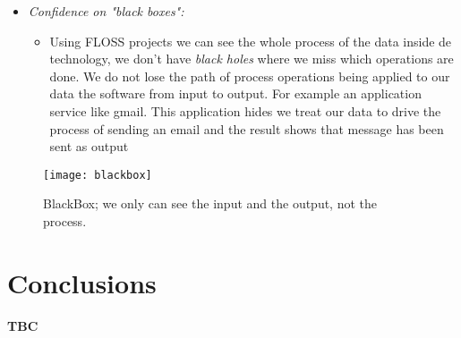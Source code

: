 \begin{itemize}
    \item \emph{Confidence on "black boxes":}
    \begin{itemize}
        \item Using FLOSS projects we can see the whole process of the data inside de technology, we don't have \emph{black holes} where we miss which operations are done. We do not lose the path of process operations being applied to our data the software from input to output. For example an application service like gmail. This application hides we treat our data to drive the process of sending an email and the result shows that message has been sent as output  
    \end{itemize}  
   
\end{itemize}

\pagebreak

    \begin{figure}[h]
        \begin{center}
            \texttt{[image: blackbox]}
            \caption[BlackBox]{BlackBox; we only can see the input and the output, not the process.}
            \label{fig:blackbox}
        \end{center}
    \end{figure}



\section{Conclusions}\label{lesson-3-conclusions}

\textbf{TBC}

